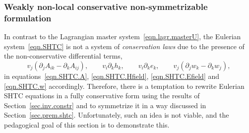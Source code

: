 \documentclass[twoside]{article}
\newcommand{\pd}{\partial}
\begin{document}
\subsubsection{Weakly non-local conservative non-symmetrizable formulation} 
\label{sec.Euler.conservative}


In contrast to the Lagrangian master system~\eqref{eqn.lagr.masterU}, the 
Eulerian system~\eqref{eqn.SHTC} is not a system of \textit{conservation laws} 
due to 
the presence of the non-conservative differential terms,
\begin{equation}\label{key}
v_j(\pd_j A_{ik} - \pd_k A_{ij}), \qquad v_i \pd_k h_k, \qquad v_i\pd_k e_k, 
\qquad v_j(\pd_jw_k - \pd_k w_j),
\end{equation}
 in 
equations~\eqref{eqn.SHTC.A}, \eqref{eqn.SHTC.Hfield}, 
\eqref{eqn.SHTC.Efield} and \eqref{eqn.SHTC.w} accordingly. Therefore, 
there is a 
temptation to rewrite Eulerian SHTC equations in a fully conservative form 
using the results of Section~\ref{sec.inv.constr} and to symmetrize it in a way 
discussed in Section~\ref{sec.prem.shtc}. Unfortunately, such an idea is not 
viable, and the 
pedagogical goal of this section is to demonstrate this. 

\end{document}
